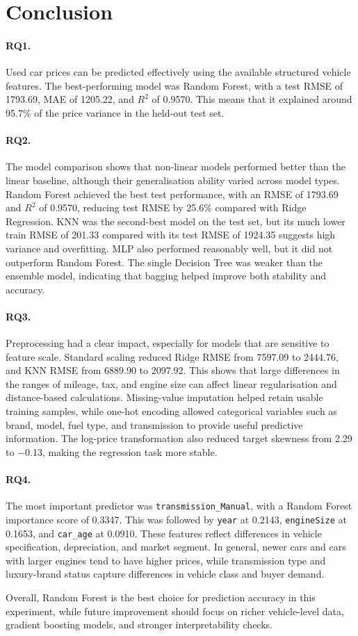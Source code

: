 \section{Conclusion}
\label{sec:conclusion}

\paragraph{RQ1.}
Used car prices can be predicted effectively using the available structured vehicle features.
The best-performing model was Random Forest, with a test RMSE of 1793.69, MAE of 1205.22, and $R^2$ of 0.9570.
This means that it explained around 95.7\% of the price variance in the held-out test set.

\paragraph{RQ2.}
The model comparison shows that non-linear models performed better than the linear baseline, although their generalisation ability varied across model types.
Random Forest achieved the best test performance, with an RMSE of 1793.69 and $R^2$ of 0.9570, reducing test RMSE by 25.6\% compared with Ridge Regression.
KNN was the second-best model on the test set, but its much lower train RMSE of 201.33 compared with its test RMSE of 1924.35 suggests high variance and overfitting.
MLP also performed reasonably well, but it did not outperform Random Forest.
The single Decision Tree was weaker than the ensemble model, indicating that bagging helped improve both stability and accuracy.

\paragraph{RQ3.}
Preprocessing had a clear impact, especially for models that are sensitive to feature scale.
Standard scaling reduced Ridge RMSE from 7597.09 to 2444.76, and KNN RMSE from 6889.90 to 2097.92.
This shows that large differences in the ranges of mileage, tax, and engine size can affect linear regularisation and distance-based calculations.
Missing-value imputation helped retain usable training samples, while one-hot encoding allowed categorical variables such as brand, model, fuel type, and transmission to provide useful predictive information.
The log-price transformation also reduced target skewness from 2.29 to $-$0.13, making the regression task more stable.

\paragraph{RQ4.}
The most important predictor was \texttt{transmission\_Manual}, with a Random Forest importance score of 0.3347.
This was followed by \texttt{year} at 0.2143, \texttt{engineSize} at 0.1653, and \texttt{car\_age} at 0.0910.
These features reflect differences in vehicle specification, depreciation, and market segment.
In general, newer cars and cars with larger engines tend to have higher prices, while transmission type and luxury-brand status capture differences in vehicle class and buyer demand.

Overall, Random Forest is the best choice for prediction accuracy in this experiment, while future improvement should focus on richer vehicle-level data, gradient boosting models, and stronger interpretability checks.
